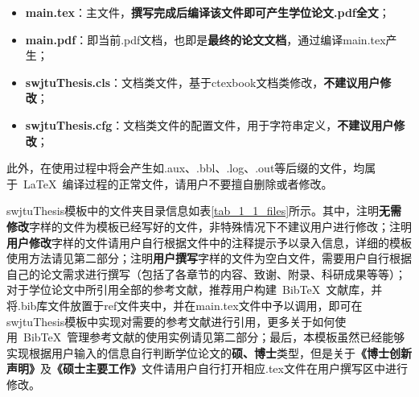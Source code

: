 \par
\begin{itemize}
  \item \textbf{main.tex}：主文件，\textbf{撰写完成后编译该文件即可产生学位论文.pdf全文}；
  \item \textbf{main.pdf}：即当前.pdf文档，也即是\textbf{最终的论文文档}，通过编译main.tex产生；
  \item \textbf{swjtuThesis.cls}：文档类文件，基于ctexbook文档类修改，\textbf{不建议用户修改}；
  \item \textbf{swjtuThesis.cfg}：文档类文件的配置文件，用于字符串定义，\textbf{不建议用户修改}；
\end{itemize}

\par
此外，在使用过程中将会产生如.aux、.bbl、.log、.out等后缀的文件，均属于~\LaTeX{}~编译过程的正常文件，请用户不要擅自删除或者修改。

\par
swjtuThesis模板中的文件夹目录信息如表\ref{tab_1_1_files}所示。其中，注明\textbf{无需修改}字样的文件为模板已经写好的文件，非特殊情况下不建议用户进行修改；注明\textbf{用户修改}字样的文件请用户自行根据文件中的注释提示予以录入信息，详细的模板使用方法请见第二部分；注明\textbf{用户撰写}字样的文件为空白文件，需要用户自行根据自己的论文需求进行撰写（包括了各章节的内容、致谢、附录、科研成果等等）；对于学位论文中所引用全部的参考文献，推荐用户构建~BibTeX~文献库，并将.bib库文件放置于ref文件夹中，并在main.tex文件中予以调用，即可在swjtuThesis模板中实现对需要的参考文献进行引用，更多关于如何使用~BibTeX~管理参考文献的使用实例请见第二部分；最后，本模板虽然已经能够实现根据用户输入的信息自行判断学位论文的\textbf{硕、博士}类型，但是关于\textbf{《博士创新声明》}及\textbf{《硕士主要工作》}文件请用户自行打开相应.tex文件在用户撰写区中进行修改。

